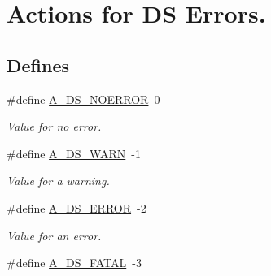 \hypertarget{group___a___d_s___actions}{
\section{Actions for DS Errors.}
\label{group___a___d_s___actions}
}
\subsection*{Defines}
\begin{DoxyCompactItemize}
\item 
\hypertarget{group___a___d_s___actions_ga83fd1c7379ac085b8a9550b8d64f3449}{
\#define \hyperlink{group___a___d_s___actions_ga83fd1c7379ac085b8a9550b8d64f3449}{A\_\-DS\_\-NOERROR}~0}
\label{group___a___d_s___actions_ga83fd1c7379ac085b8a9550b8d64f3449}

\begin{DoxyCompactList}\small\item\em Value for no error. \item\end{DoxyCompactList}\item 
\hypertarget{group___a___d_s___actions_gad61c12e433c47da75f4322d9358c3617}{
\#define \hyperlink{group___a___d_s___actions_gad61c12e433c47da75f4322d9358c3617}{A\_\-DS\_\-WARN}~-\/1}
\label{group___a___d_s___actions_gad61c12e433c47da75f4322d9358c3617}

\begin{DoxyCompactList}\small\item\em Value for a warning. \item\end{DoxyCompactList}\item 
\hypertarget{group___a___d_s___actions_gabaa9a22cc1abc78916b99695489f8df8}{
\#define \hyperlink{group___a___d_s___actions_gabaa9a22cc1abc78916b99695489f8df8}{A\_\-DS\_\-ERROR}~-\/2}
\label{group___a___d_s___actions_gabaa9a22cc1abc78916b99695489f8df8}

\begin{DoxyCompactList}\small\item\em Value for an error. \item\end{DoxyCompactList}\item 
\hypertarget{group___a___d_s___actions_gad3e083f0c8d34073d3597724c2a264f6}{
\#define \hyperlink{group___a___d_s___actions_gad3e083f0c8d34073d3597724c2a264f6}{A\_\-DS\_\-FATAL}~-\/3}
\label{group___a___d_s___actions_gad3e083f0c8d34073d3597724c2a264f6}


\end{DoxyCompactItemize}
